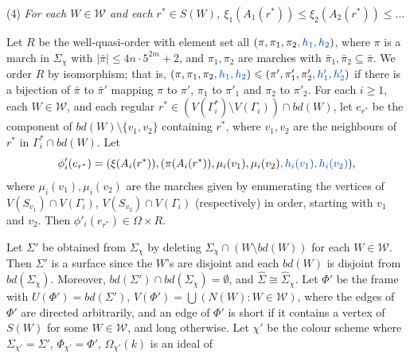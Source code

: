 \hspace*{12pt}(4) \textit{For each $W \in \mathscr{W}$ and each $r^* \in S(W)$, $\xi_1(A_1(r^*)) \le \xi_2(A_2(r^*)) \le \dots$}

{\sloppy Let $R$ be the well-quasi-order with element set all   $(\pi, \pi_1, \pi_2\fix{, h_1, h_2})$, where $\pi$ is a march in $\Sigma_\chi$ with $|\bar{\pi}| \le 4n \cdot 5^{2m} + 2$, and $\pi_1, \pi_2$ are marches with $\bar{\pi}_1, \bar{\pi}_2 \subseteq \bar{\pi}$. We order $R$ by isomorphism; that is, $(\pi, \pi_1, \pi_2\fix{, h_1, h_2}) \le (\pi', \pi'_1, \pi'_2\fix{, h'_1, h'_2})$ if  there is a bijection of $\bar{\pi}$ to $\bar{\pi}'$ mapping $\pi$ to $\pi'$, $\pi_1$ to $\pi'_1$ and $\pi_2$ to $\pi'_2$. For each $i \ge 1$, each $W \in \mathscr{W}$, and each regular $r^* \in (V(\Gamma_i^*) \setminus V(\Gamma_i)) \cap bd(W)$, let $e_{r^*}$ be the component of $bd(W) \setminus \{v_1, v_2\}$ containing $r^*$, where $v_1, v_2$ are the neighbours of $r^*$ in $\Gamma_i^* \cap bd(W)$. Let
\begin{equation*}
\phi'_i(e_{r^*}) = (\xi(A_i(r^*)), (\pi(A_i(r^*)), \mu_i(v_1), \mu_i(v_2)\fix{, h_i(v_1), h_i(v_2)}),
\end{equation*}
where $\mu_i(v_1), \mu_i(v_2)$ are the marches given by enumerating the vertices of $V(S_{v_1}) \cap V(\Gamma_i)$, $V(S_{v_2}) \cap V(\Gamma_i)$ (respectively) in order, starting with $v_1$ and $v_2$. Then $\phi'_i(e_{r^*}) \in \Omega \times R$.\par}

Let $\Sigma'$ be obtained from $\Sigma_\chi$ by deleting $\Sigma_\chi \cap (W \setminus bd(W))$ for each $W \in \mathscr{W}$. Then $\Sigma'$ is a surface since the $W$'s are disjoint and each $bd(W)$ is disjoint from $bd(\Sigma_\chi)$. Moreover, $bd(\Sigma') \cap bd(\Sigma_\chi) = \emptyset$, and $\hat{\Sigma} \cong \hat{\Sigma}_\chi$. Let $\Phi'$ be the frame with $U(\Phi') = bd(\Sigma')$, $V(\Phi') = \bigcup (N(W) : W \in \mathscr{W})$, where the edges of $\Phi'$ are directed arbitrarily, and an edge of $\Phi'$ is short if it contains a vertex of $S(W)$ for some $W \in \mathscr{W}$, and long otherwise. Let $\chi'$ be the colour scheme where $\Sigma_{\chi'} = \Sigma'$, $\Phi_{\chi'} = \Phi'$, $\Omega_{\chi'}(k)$ is an ideal of
